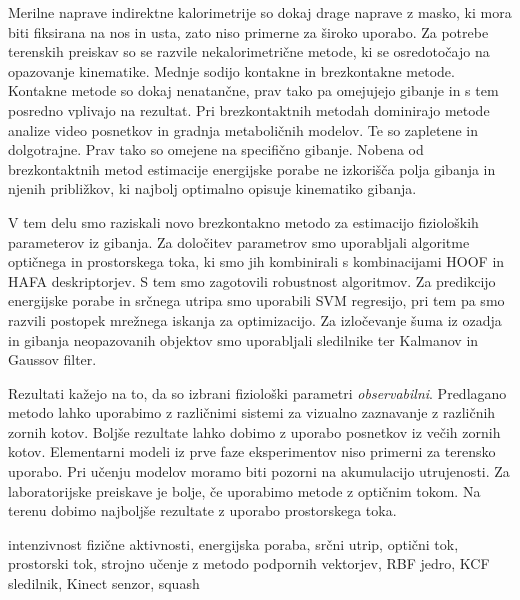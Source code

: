 \povzetekp
Merilne naprave indirektne kalorimetrije so dokaj drage naprave z masko, ki mora biti fiksirana na nos in usta, zato niso primerne za široko uporabo. Za potrebe terenskih preiskav so se razvile nekalorimetrične metode, ki se osredotočajo na opazovanje kinematike. Mednje sodijo kontakne in brezkontakne metode. Kontakne metode so dokaj nenatančne, prav tako pa omejujejo gibanje in s tem posredno vplivajo na rezultat. Pri brezkontaktnih metodah dominirajo metode analize video posnetkov in gradnja metaboličnih modelov. Te so zapletene in dolgotrajne. Prav tako so omejene na specifično gibanje. Nobena od brezkontaktnih metod estimacije energijske porabe ne izkorišča polja gibanja in njenih približkov, ki najbolj optimalno opisuje kinematiko gibanja.

V tem delu smo raziskali novo brezkontakno metodo za estimacijo fizioloških parameterov iz gibanja. Za določitev parametrov smo uporabljali algoritme optičnega in prostorskega toka, ki smo jih kombinirali s kombinacijami HOOF in HAFA deskriptorjev. S tem smo zagotovili robustnost algoritmov. Za predikcijo energijske porabe in srčnega utripa smo uporabili SVM regresijo, pri tem pa smo razvili \nurbf postopek mrežnega iskanja za optimizacijo. Za izločevanje šuma iz ozadja in gibanja neopazovanih objektov smo uporabljali sledilnike ter Kalmanov in Gaussov filter.

Rezultati kažejo na to, da so izbrani fiziološki parametri \emph{observabilni}. Predlagano metodo lahko uporabimo z različnimi sistemi za vizualno zaznavanje z različnih zornih kotov. Boljše rezultate lahko dobimo z uporabo posnetkov iz večih zornih kotov. Elementarni modeli iz prve faze eksperimentov niso primerni za terensko uporabo. Pri učenju modelov moramo biti pozorni na akumulacijo utrujenosti. Za laboratorijske preiskave je bolje, če uporabimo metode z optičnim tokom. Na terenu dobimo najboljše rezultate z uporabo prostorskega toka.


\kljucnebesede intenzivnost fizične aktivnosti, energijska poraba, srčni utrip, optični tok, prostorski tok, strojno učenje z metodo podpornih vektorjev, RBF jedro, KCF sledilnik, Kinect senzor, squash